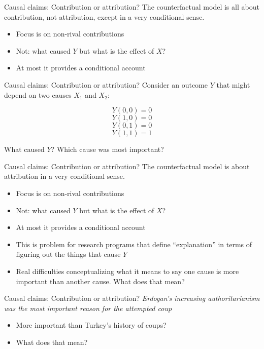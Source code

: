 \documentclass[
  11pt,
  ignorenonframetext,
]{beamer}
\providecommand{\tightlist}{%
  \setlength{\itemsep}{0pt}\setlength{\parskip}{0pt}}\usepackage{longtable,booktabs,array}
\begin{document}
\begin{frame}{Causal claims: Contribution or attribution?}
\protect\hypertarget{causal-claims-contribution-or-attribution}{}
The counterfactual model is all about contribution, not attribution,
except in a very conditional sense.

\begin{itemize}
\tightlist
\item
  Focus is on non-rival contributions
\item
  Not: what caused \(Y\) but what is the effect of \(X\)?
\item
  At most it provides a conditional account
\end{itemize}
\end{frame}

\begin{frame}{Causal claims: Contribution or attribution?}
\protect\hypertarget{causal-claims-contribution-or-attribution-1}{}
Consider an outcome \(Y\) that might depend on two causes \(X_1\) and
\(X_2\):

\[Y(0,0) = 0\] \[Y(1,0) = 0\] \[Y(0,1) = 0\] \[Y(1,1) = 1\]

What caused \(Y\)? Which cause was most important?
\end{frame}

\begin{frame}{Causal claims: Contribution or attribution?}
\protect\hypertarget{causal-claims-contribution-or-attribution-2}{}
The counterfactual model is about attribution in a very conditional
sense.

\begin{itemize}
\item
  Focus is on non-rival contributions
\item
  Not: what caused \(Y\) but what is the effect of \(X\)?
\item
  At most it provides a conditional account
\item
  This is problem for research programs that define ``explanation'' in
  terms of figuring out the things that cause \(Y\)
\item
  Real difficulties conceptualizing what it means to say one cause is
  more important than another cause. What does that mean?
\end{itemize}
\end{frame}

\begin{frame}{Causal claims: Contribution or attribution?}
\protect\hypertarget{causal-claims-contribution-or-attribution-3}{}
\emph{Erdogan's increasing authoritarianism was the most important
reason for the attempted coup}

\begin{itemize}
\tightlist
\item
  More important than Turkey's history of coups?
\item
  What does that mean?
\end{itemize}
\end{frame}
\end{document}
